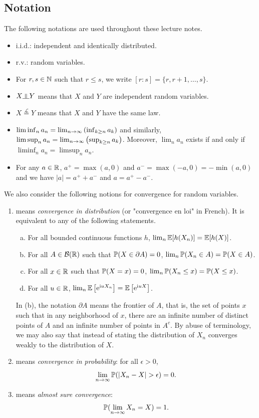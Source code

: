 \documentclass[english,graybox,envcountchap,envcountsame,sectrefs,shortlabels]{svmono}
\theoremstyle{style}
\newcommand{\borel}{\mathcal{B}}
\newcommand{\weaklim}{\ensuremath{\stackrel{\mathcal{L}_{\PP}}{\Rightarrow}}}
\newcommand{\eqLaw}{\stackrel{\mathcal L}{=}}
\newcommand{\indep}{\rotatebox[origin=c]{90}{$\models$}}
\newcommand{\rme}{\mathrm{e}}
\newcommand{\rmi}{\mathrm{i}}
\newcommand{\plim}[1]{\stackrel{#1-prob}{\longrightarrow}}
\newcommand{\eqsp}{}
\begin{document}
\subsection*{Notation}
The following notations are used throughout these lecture notes.
\begin{itemize}
\item i.i.d.:  independent and identically distributed.
\item r.v.:  random variables.
\item For $r,s \in \mathbb{N}$ such that $r\leq s$, we write $[r:s]=\{r,r+1,\ldots,s\}$.
\item $X\indep Y$ means that $X$ and $Y$ are independent random variables.
\item $X \eqLaw Y$ means that $X$ and $Y$ have the same law.
\item $\liminf_n a_n=\lim_{n \to\infty} \left(\inf_{k \geq n} a_k\right)$ and similarly, $\limsup_n a_n=\lim_{n \to\infty} \left(\sup_{k \geq n} a_k\right)$. Moreover, $\lim_n a_n$ exists if and only if $\liminf_n a_n=\limsup_n a_n$.
\item For any $a\in \mathbb{R}$, $a^+=\max(a,0)$ and $a^-=\max(-a,0)=-\min(a,0)$ and we have $|a|=a^++a^-$ and $a=a^+-a^-$.
\end{itemize}
We also consider the following notions for convergence for random variables.
\begin{enumerate}[$\blacktriangleright$]
\item \fbox{$X_n \weaklim X$} means {\em convergence in distribution} (or "convergence en loi" in French). It is equivalent to any of the following statements.
     \begin{enumerate}[(a)]
     \item For all bounded continuous functions $h$, $\lim_{n}\mathbb{E}[h(X_n)]=\mathbb{E}[h(X)]$.
    \item  For all $A \in \borel(\rset)$ such that $\mathbb{P}(X \in \partial A)=0$,  $\lim_n \mathbb{P}(X_n \in A)=\mathbb{P}(X\in A)$.
        \item For all $x\in \mathbb{R}$ such that $\mathbb{P}(X=x)=0$, $\lim_n \mathbb{P}(X_n \leq x)=\mathbb{P}(X \leq x)$.
\item For all $u \in \mathbb{R}$, $\lim_n \PE\lrb{\rme^{\rmi u X_n}}=\PE\lrb{\rme^{\rmi u X}}$.
     \end{enumerate}
     In (b), the notation $\partial A$ means the frontier of $A$, that is, the set of points $x$ such that in any neighborhood of $x$, there are an infinite number of distinct points of $A$ and an infinite number of points in $A^c$.
     By abuse of terminology, we may also say that  instead of stating the distribution of $X_n$ converges weakly to the distribution of $X$.
\item \fbox{$X_n \plim{\PP} X$} means {\em convergence in probability}: for all $\epsilon>0$,
$$
\lim_{n \to \infty} \PP(|X_n -X|>\epsilon)=0.
$$
\item {} means {\em almost sure convergence}:
$$
\PP(\lim_{n \to \infty}X_n=X)=1\eqsp.
$$
\end{enumerate}
\end{document}

